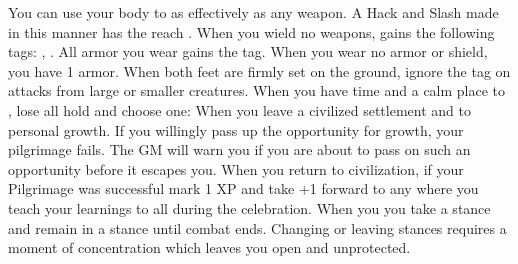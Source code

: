 \documentclass[darkmode]{dw_playbook}
\begin{document}
\begin{minipage}[t]{0.90\textwidth}
\begin{minipage}[t]{0.65\textwidth}
\begin{multicols*}{2}
{                You can use your body to  as effectively as any weapon.  A Hack and Slash made in this manner has the reach .}
            \vgap
            \vgap
                {When you wield no weapons,  gains the following tags: , .  All armor you wear gains the  tag.}
            \vgap
                {When you wear no armor or shield, you have 1 armor.  When both feet are firmly set on the ground, ignore the  tag on attacks from large or smaller creatures.}
            \vgap
            {When you have time and a calm place to , lose all hold and choose one:
            \vsgap
            \vsgap
            \vsgap
            \vgap}
            {When you leave a civilized settlement and  to personal growth.
            \vsgap
            \vsgap
            \vsgap
            \vsgap
            \vsgap
            \vsgap
            \vgap
            If you willingly pass up the opportunity for growth, your pilgrimage fails.  The GM will warn you if you are about to pass on such an opportunity before it escapes you.  When you return to civilization, if your Pilgrimage was successful mark 1 XP and take +1 forward to any  where you teach your learnings to all during the celebration.
            }
            \vgap
                {When you  you take a stance and remain in a stance until combat ends.  Changing or leaving stances requires a moment of concentration which leaves you open and unprotected.
                \vsgap
                \vsgap
                \vsgap
                }
        \end{multicols*}
    \end{minipage}
\end{minipage}
\begin{minipage}[t]{0.05\textwidth}
    ~ %
\end{minipage}
\end{document}
